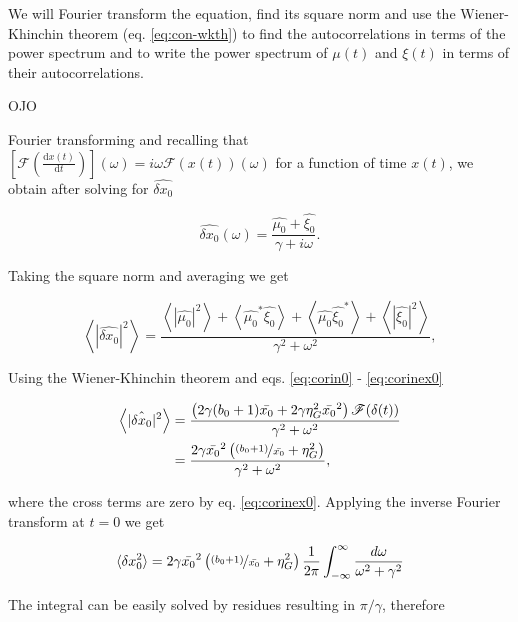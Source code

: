 We will Fourier transform the equation, find its square norm and use the Wiener-Khinchin theorem (eq. \eqref{eq:con-wkth}) to find the autocorrelations in terms of the power spectrum and to write the power spectrum of $\mu(t)$ and $\xi(t)$ in terms of their autocorrelations.

OJO

Fourier transforming and recalling that $[\mathscr{F}(\frac{\mathrm{d}x(t)}{\mathrm{d}t})](\omega) = i\omega \mathscr{F}(x(t))(\omega)$ for a function of time $x(t)$, we obtain after solving for $\hat{\delta x_0}$

\begin{equation}
\label{eq:fgene0}
\hat{\delta x_0}(\omega) = \frac{\hat{\mu_0}+\hat{\xi_0}}{\gamma + i\omega}.
\end{equation}

Taking the square norm and averaging we get

\begin{equation}
\left\langle |\hat{\delta x_0}|^2 \right\rangle = \frac{\left\langle|\hat{\mu_0}|^2\right\rangle + \left\langle\hat{\mu_0}^*\hat{\xi_0}\right\rangle+\left\langle\hat{\mu_0}\hat{\xi_0}^*\right\rangle+\left\langle|\hat{\xi_0}|^2\right\rangle}{\gamma^2 + \omega^2},
\end{equation}

Using the Wiener-Khinchin theorem and eqs. \eqref{eq:corin0} - \eqref{eq:corinex0}

\begin{equation}
  \label{eq:pgene0}
  \begin{split}
    \left\langle |\hat{\delta x_0}|^2 \right\rangle &= \frac{\left(2\gamma(b_0+1)\bar{x_0}+ 2\gamma\eta_G^2\bar{x_0}^2\right)\mathscr{F}(\delta(t))}{\gamma^2+\omega^2}\\
    &=\frac{2\gamma\bar{x_0}^2\left(\nicefrac{(b_0+1)}{\bar{x_0}}+ \eta_G^2\right)}{\gamma^2+\omega^2},
  \end{split}
\end{equation}

where the cross terms are zero by eq. \eqref{eq:corinex0}. Applying the inverse Fourier transform at $t=0$ we get

\begin{equation*}
\langle \delta x_0^2 \rangle = 2\gamma\bar{x_0}^2\left(\nicefrac{(b_0+1)}{\bar{x_0}}+ \eta_G^2\right)\frac{1}{2\pi}\int_{-\infty}^{\infty}\frac{d\omega}{\omega^2+\gamma^2}
\end{equation*}

The integral can be easily solved by residues resulting in $\pi/\gamma$, therefore

